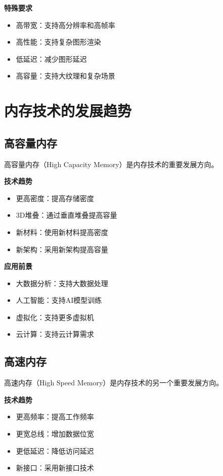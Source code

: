 \documentclass{article}
\begin{document}
\textbf{特殊要求}
\begin{itemize}
    \item 高带宽：支持高分辨率和高帧率
    \item 高性能：支持复杂图形渲染
    \item 低延迟：减少图形延迟
    \item 高容量：支持大纹理和复杂场景
\end{itemize}

\section{内存技术的发展趋势}

\subsection{高容量内存}

高容量内存（High Capacity Memory）是内存技术的重要发展方向。

\textbf{技术趋势}
\begin{itemize}
    \item 更高密度：提高存储密度
    \item 3D堆叠：通过垂直堆叠提高容量
    \item 新材料：使用新材料提高密度
    \item 新架构：采用新架构提高容量
\end{itemize}

\textbf{应用前景}
\begin{itemize}
    \item 大数据分析：支持大数据处理
    \item 人工智能：支持AI模型训练
    \item 虚拟化：支持更多虚拟机
    \item 云计算：支持云计算需求
\end{itemize}

\subsection{高速内存}

高速内存（High Speed Memory）是内存技术的另一个重要发展方向。

\textbf{技术趋势}
\begin{itemize}
    \item 更高频率：提高工作频率
    \item 更宽总线：增加数据位宽
    \item 更低延迟：降低访问延迟
    \item 新接口：采用新接口技术
\end{itemize}
\end{document}

